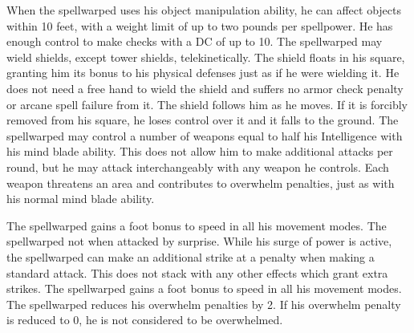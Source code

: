     When the spellwarped uses his object manipulation ability, he can affect objects within 10 feet, with a weight limit of up to two pounds per spellpower.
    He has enough control to make checks with a DC of up to 10.
    The spellwarped may wield shields, except tower shields, telekinetically.
    The shield floats in his square, granting him its bonus to his physical defenses just as if he were wielding it.
    He does not need a free hand to wield the shield and suffers no armor check penalty or arcane spell failure from it.
    The shield follows him as he moves.
    If it is forcibly removed from his square, he loses control over it and it falls to the ground.
    The spellwarped may control a number of weapons equal to half his Intelligence with his mind blade ability.
    This does not allow him to make additional attacks per round, but he may attack interchangeably with any weapon he controls.
    Each weapon threatens an area and contributes to overwhelm penalties, just as with his normal mind blade ability.

    The spellwarped gains a  foot bonus to speed in all his movement modes.
    The spellwarped not \unaware when attacked by surprise.
    While his surge of power is active, the spellwarped can make an additional strike at a  penalty when making a standard attack.
    This does not stack with any other effects which grant extra strikes.
    The spellwarped gains a  foot bonus to speed in all his movement modes.
    The spellwarped reduces his overwhelm penalties by 2.
    If his overwhelm penalty is reduced to 0, he is not considered to be overwhelmed.

